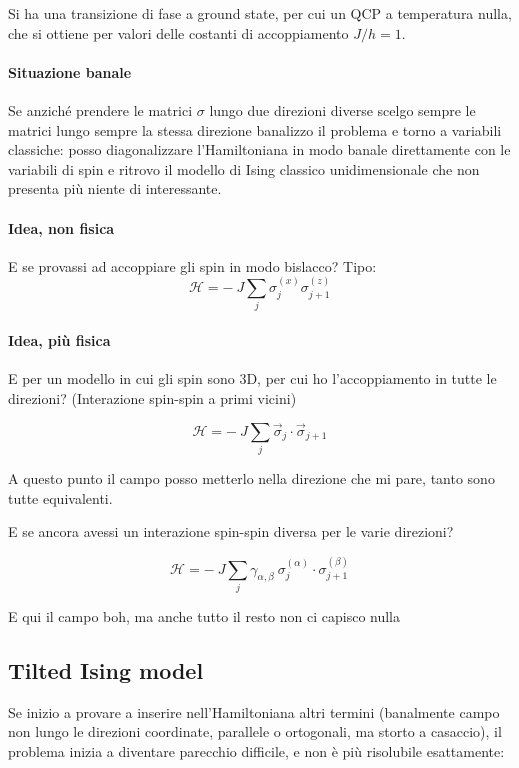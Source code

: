 \documentclass[a4paper,10pt]{article}
\begin{document}
Si ha una transizione di fase a ground state, per cui un QCP a temperatura nulla, che si ottiene per valori delle costanti di accoppiamento $J/h = 1$.

\paragraph{Situazione banale} Se anziché prendere le matrici $\sigma$ lungo due direzioni diverse scelgo sempre le matrici lungo sempre la stessa direzione banalizzo il problema e torno a variabili classiche: posso diagonalizzare l'Hamiltoniana in modo banale direttamente con le variabili di spin e ritrovo il modello di Ising classico unidimensionale che non presenta più niente di interessante.

\paragraph{Idea, non fisica} E se provassi ad accoppiare gli spin in modo bislacco? Tipo:
\begin{equation}
\mathcal{H} = -~ J \sum_j \sigma_j^{(x)} \sigma_{j+1}^{(z)}
\end{equation}

\paragraph{Idea, più fisica} E per un modello in cui gli spin sono $3$D, per cui ho l'accoppiamento in tutte le direzioni? (Interazione spin-spin a primi vicini)


\begin{equation}
\mathcal{H} = -~ J \sum_j \vec{\sigma}_j \cdot \vec{\sigma}_{j+1}
\end{equation}

\noindent A questo punto il campo posso metterlo nella direzione che mi pare, tanto sono tutte equivalenti.

E se ancora avessi un interazione spin-spin diversa per le varie direzioni?

\begin{equation}
\mathcal{H} = -~ J \sum_j \gamma_{\alpha, \beta} ~ \sigma_j^{(\alpha)} \cdot \sigma_{j+1}^{(\beta)}
\end{equation}

\noindent E qui il campo boh, ma anche tutto il resto non ci capisco nulla


\subsection{Tilted Ising model} Se inizio a provare a inserire nell'Hamiltoniana altri termini (banalmente campo non lungo le direzioni coordinate, parallele o ortogonali, ma storto a casaccio), il problema inizia a diventare parecchio difficile, e non è più risolubile esattamente:
\end{document}
